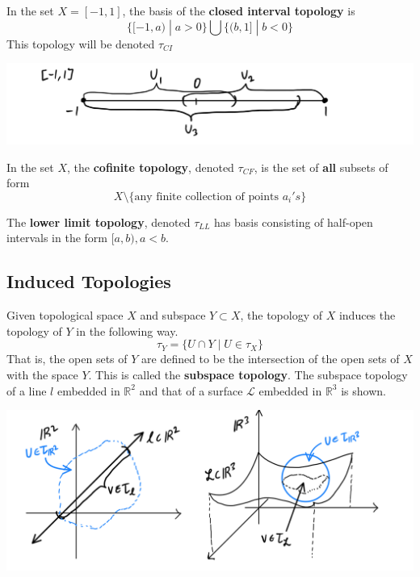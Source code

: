 \documentclass{article}
\begin{document}
    \begin{definition}
    In the set $X = [-1, 1]$, the basis of the \textbf{closed interval topology} is 
    \[ \big\{ [-1, a) \; | \; a>0 \big\} \bigcup \big\{ (b, 1] \; | \; b<0 \big\} \]
    This topology will be denoted $\tau_{CI}$
    \begin{center}
        \includegraphics[scale=0.25]{img/Closed_Interval_Topology.PNG}
    \end{center}
    \end{definition}

    \begin{definition}
    In the set $X$, the \textbf{cofinite topology}, denoted $\tau_{CF}$, is the set of \textbf{all} subsets of form 
    \begin{equation}
      X \setminus \{\text{any finite collection of points $a_{i}'s$}\}
    \end{equation}
    \end{definition}

    \begin{definition}
    The \textbf{lower limit topology}, denoted $\tau_{LL}$ has basis consisting of half-open intervals in the form $[a, b), a<b$. 
    \end{definition}

  \subsection{Induced Topologies}

    \begin{definition}
    Given topological space $X$ and subspace $Y \subset X$, the topology of $X$ induces the topology of $Y$ in the following way. 
    \[\tau_Y = \{U \cap Y\;|\; U \in \tau_X\}\]
    That is, the open sets of $Y$ are defined to be the intersection of the open sets of $X$ with the space $Y$. This is called the \textbf{subspace topology}. The subspace topology of a line $l$ embedded in $\mathbb{R}^2$ and that of a surface $\mathcal{L}$ embedded in $\mathbb{R}^3$ is shown. 
    \begin{center}
        \includegraphics[scale=0.25]{img/Subspace_Topology.PNG}
    \end{center}
    \end{definition}
\end{document}
